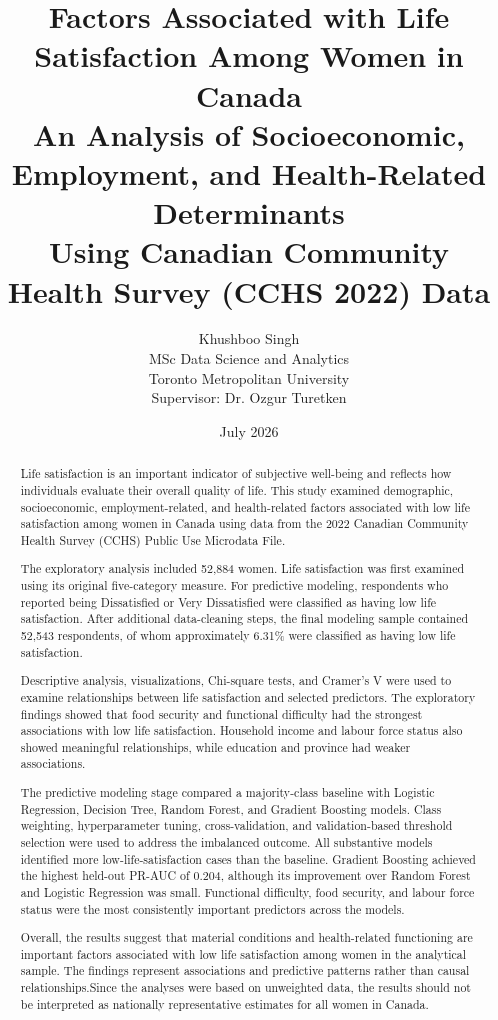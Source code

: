 \documentclass[12pt]{article}
\title{
    \vspace{-2cm}
    \textbf{Factors Associated with Life Satisfaction Among Women in Canada}\\
    \vspace{0.4cm}
    \large An Analysis of Socioeconomic, Employment, and Health-Related Determinants\\
    \large Using Canadian Community Health Survey (CCHS 2022) Data
}
\author{
    Khushboo Singh\\
    \vspace{0.3cm}
    MSc Data Science and Analytics\\
    Toronto Metropolitan University\\
    \vspace{0.3cm}
    Supervisor: Dr. Ozgur Turetken
}
\date{July 2026}
\begin{document}
\maketitle

\begin{abstract}

Life satisfaction is an important indicator of subjective well-being and reflects how individuals evaluate their overall quality of life. This study examined demographic, socioeconomic, employment-related, and health-related factors associated with low life satisfaction among women in Canada using data from the 2022 Canadian Community Health Survey (CCHS) Public Use Microdata File.

The exploratory analysis included 52,884 women. Life satisfaction was first examined using its original five-category measure. For predictive modeling, respondents who reported being Dissatisfied or Very Dissatisfied were classified as having low life satisfaction. After additional data-cleaning steps, the final modeling sample contained 52,543 respondents, of whom approximately 6.31\% were classified as having low life satisfaction.

Descriptive analysis, visualizations, Chi-square tests, and Cramer's V were used to examine relationships between life satisfaction and selected predictors. The exploratory findings showed that food security and functional difficulty had the strongest associations with low life satisfaction. Household income and labour force status also showed meaningful relationships, while education and province had weaker associations.

The predictive modeling stage compared a majority-class baseline with Logistic Regression, Decision Tree, Random Forest, and Gradient Boosting models. Class weighting, hyperparameter tuning, cross-validation, and validation-based threshold selection were used to address the imbalanced outcome. All substantive models identified more low-life-satisfaction cases than the baseline. Gradient Boosting achieved the highest held-out PR-AUC of 0.204, although its improvement over Random Forest and Logistic Regression was small. Functional difficulty, food security, and labour force status were the most consistently important predictors across the models.

Overall, the results suggest that material conditions and health-related functioning are important factors associated with low life satisfaction among women in the analytical sample. The findings represent associations and predictive patterns rather than causal relationships.Since the analyses were based on unweighted data, the results should
not be interpreted as nationally representative estimates for all
women in Canada.

\end{abstract}
\end{document}

